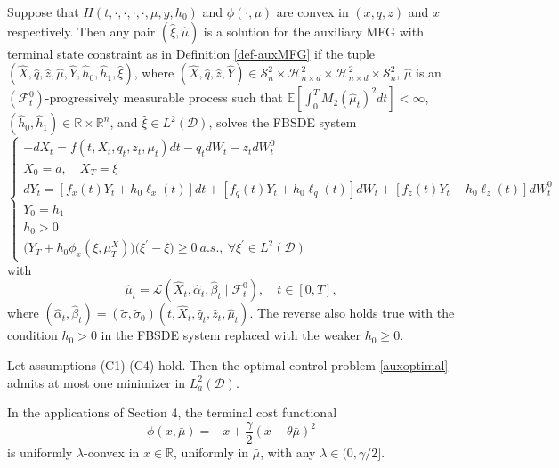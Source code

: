 \documentclass[10pt,a4paper]{amsart}
\begin{document}
\begin{theo} 
\label{verification}
Suppose that $H(t,\cdot, \cdot, \cdot, \cdot, \mu, y, h_0)$ and $\phi(\cdot, \mu)$ are convex in $(x,q, z)$ and $x$ respectively. 
Then any pair $(\hat \xi, \hat \mu )$ is a solution for the auxiliary MFG with terminal state constraint as in Definition \ref{def-auxMFG} if the tuple $( \hat X,   \hat q,  \hat z,  \hat \mu,   \hat Y,  \hat {h}_0, \hat {h}_1, \hat {\xi})$, where $( \hat X,   \hat q,  \hat z,  \hat Y) \in \mathcal S^2 _n \times \mathcal H^2 _{n\times d} \times \mathcal H^2 _{n\times d} \times \mathcal S^2 _n$, $\hat \mu$ is an $(\mathcal F_t ^0)$-progressively measurable process such that $\mathbb E \left[\int_0^T M_2(\hat \mu_t)^2 dt\right]<\infty$, $( \hat h_0,  \hat h_1) \in \mathbb R \times \mathbb R^n$, and $\hat \xi \in L^2(\mathcal D)$, solves the FBSDE system
\begin{equation}
\label{FBSDE MFG CN}
\begin{cases}
    -dX_t=f(t,X_t, q_t, z_t, \mu_t)dt -q_tdW_t-z_tdW_t^0\\
      X_0 =a, \quad X_T=\xi\\
    dY_t=[f_x(t)Y_t+h_0 \ell_x(t)]dt+[f _q(t)Y_t+h_0 \ell_q(t)]dW_t+[f_z(t)Y_t+h_0 \ell_z(t)]dW_t^0\\
        Y_0=h_1\\
        h_0 > 0\\
    \big( Y_T+h_0\phi_x(\xi,\mu_T^X)\big) \big(\xi^\prime -\xi \big) \geq 0 \ a.s., \ \forall \xi^\prime \in L^2(\mathcal{D})
\end{cases}
\end{equation}
with
\[\hat{\mu}_t=\mathcal{L}(\hat X_t, \hat \alpha_t , \hat {\beta}_t \mid \mathcal F_t ^0),   \quad  t\in [0,T],\]
where 
$ (\hat \alpha_t , \hat \beta_t ) = (\tilde \sigma, \tilde \sigma_0)(t, \hat X_t , \hat q_t , \hat z_t , \hat \mu_t ).$
The reverse also holds true with the condition $h_0 >0$ in the FBSDE system replaced with the weaker $h_0 \geq 0$.
\end{theo}

\begin{prop}
\label{uniquexi}
Let assumptions (C1)-(C4) hold. Then the optimal control problem \eqref{auxoptimal} admits at most one minimizer in $L^2_a(\mathcal D)$.
\end{prop}

\begin{rem}\label{uniq-appl}
In the applications of Section 4,  the terminal cost functional
\[
\phi(x,\bar{\mu}) = -x + \frac{\gamma}{2}(x - \theta\bar{\mu})^2
\]
is uniformly $\lambda$-convex in $x \in \mathbb{R}$, uniformly in $\bar{\mu}$, with any $\lambda \in (0, \gamma / 2]$. 
\end{rem}
\end{document}
